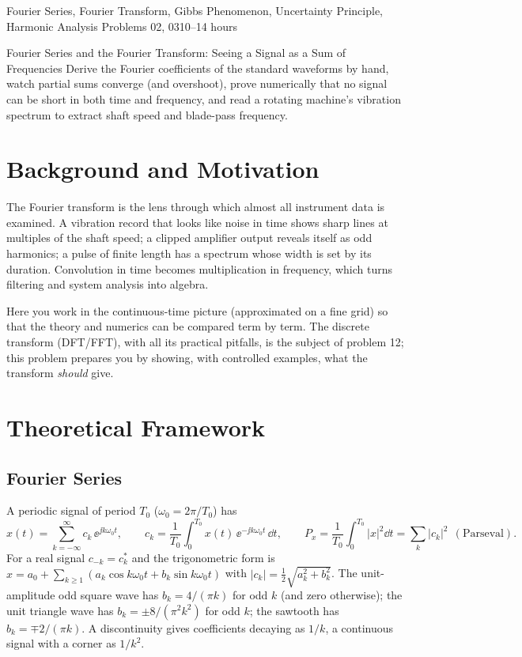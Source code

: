 \documentclass[11pt,a4paper]{article}
\begin{document}
%
{Fourier Series, Fourier Transform, Gibbs Phenomenon, Uncertainty Principle, Harmonic Analysis}%
{Problems 02, 03}{10--14 hours}

\begin{summarybox}{Fourier Series and the Fourier Transform: Seeing a Signal as a Sum of Frequencies}
Derive the Fourier coefficients of the standard waveforms by hand, watch partial sums converge (and overshoot), prove numerically that no signal can be short in both time and frequency, and read a rotating machine's vibration spectrum to extract shaft speed and blade-pass frequency.
\end{summarybox}


\section*{Background and Motivation}
The Fourier transform is the lens through which almost all instrument data is examined. A vibration record that looks like noise in time shows sharp lines at multiples of the shaft speed; a clipped amplifier output reveals itself as odd harmonics; a pulse of finite length has a spectrum whose width is set by its duration. Convolution in time becomes multiplication in frequency, which turns filtering and system analysis into algebra.

Here you work in the continuous-time picture (approximated on a fine grid) so that the theory and numerics can be compared term by term. The discrete transform (DFT/FFT), with all its practical pitfalls, is the subject of problem 12; this problem prepares you by showing, with controlled examples, what the transform \emph{should} give.

\section*{Theoretical Framework}
\subsection{Fourier Series}
A periodic signal of period $T_0$ ($\omega_0=2\pi/T_0$) has
\begin{equation}
  x(t)=\sum_{k=-\infty}^{\infty}c_k\,\ee^{\jj k\omega_0t},\qquad
  c_k=\frac1{T_0}\int_0^{T_0}x(t)\,\ee^{-\jj k\omega_0t}\,\dd t,\qquad
  P_x=\frac1{T_0}\int_0^{T_0}|x|^2\dd t=\sum_k|c_k|^2\ \ (\text{Parseval}).
  \label{eq:fs}
\end{equation}
For a real signal $c_{-k}=c_k^\ast$ and the trigonometric form is $x=a_0+\sum_{k\ge1}(a_k\cos k\omega_0t+b_k\sin k\omega_0t)$ with $|c_k|=\tfrac12\sqrt{a_k^2+b_k^2}$. The unit-amplitude odd square wave has $b_k=4/(\pi k)$ for odd $k$ (and zero otherwise); the unit triangle wave has $b_k=\pm8/(\pi^2k^2)$ for odd $k$; the sawtooth has $b_k=\mp2/(\pi k)$. A discontinuity gives coefficients decaying as $1/k$, a continuous signal with a corner as $1/k^2$.
\end{document}

